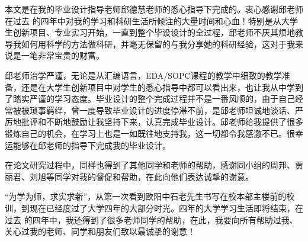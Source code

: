 ﻿\begin{publishcopyright}

本文是在我的毕业设计指导老师邱德慧老师的悉心指导下完成的。衷心感谢邱老师在过去
的四年中对我的学习和科研生活所倾注的大量时间和心血！特别是从大学生创新项目、专业实习开始，一直到整个毕设设计的全过程，邱老师不厌其烦地教导我如何用科学的方法做科研，并毫无保留的与我分享她的科研经验，这对于我来说是一笔非常宝贵的财富。

邱老师治学严谨，无论是从汇编语言，EDA/SOPC课程的教学中细致的教学准备，还是在大学生创新项目中对学生的悉心指导中都可以看出来，也让我从中学到了踏实严谨的学习态度。毕业设计的整个完成过程并不是一番风顺的，由于自己经常被被琐事羁绊，曾一度导致毕业设计的进度停滞不前，是邱老师坦诚地谈话、严厉地批评和不断地鼓励让我坚持下来，认真完成毕业设计。邱老师给我提供了很多锻炼自己的机会，在学习上也是一如既往地支持我，这一切都令我感激不已。很幸运能够在邱老师的指导下完成我的毕业设计。

在论文研究过程中，同样也得到了其他同学和老师的帮助，感谢同小组的周邦、贾丽君、刘旭等同学对我的督促和帮助，在此向他们表达诚挚的谢意。


 “为学为师，求实求新”，从第一次看到欧阳中石老先生书写在校本部主楼前的校训，到现在已经度过了大学四年的大部分时光。四年的大学学习生活即将结束，在过去
 的四年中，我还得到了很多老师同学的帮助，在此，我要向所有帮助过我、关心过我的老师、同学和朋友们致以最诚挚的谢意！


\end{publishcopyright}
